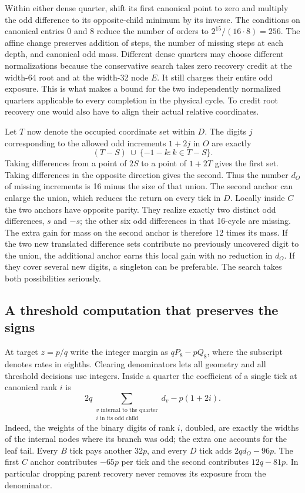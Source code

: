 \documentclass[12pt,letterpaper]{article}
\begin{document}
Within either dense quarter, shift its first canonical point to zero and multiply the odd difference to its opposite-child minimum by its inverse. The conditions on canonical entries 0 and 8 reduce the number of orders to \(2^{15}/(16\cdot8)=256\). The affine change preserves addition of steps, the number of missing steps at each depth, and canonical odd mass. Different dense quarters may choose different normalizations because the conservative search takes zero recovery credit at the width-64 root and at the width-32 node \(E\). It still charges their entire odd exposure. This is what makes a bound for the two independently normalized quarters applicable to every completion in the physical cycle. To credit root recovery one would also have to align their actual relative coordinates.

Let \(T\) now denote the occupied coordinate set within \(D\). The digits \(j\) corresponding to the allowed odd increments \(1+2j\) in \(O\) are exactly
\[
                   (T-S)\ \cup\ \{-1-k:k\in T-S\}.
\]
Taking differences from a point of \(2S\) to a point of \(1+2T\) gives the first set. Taking differences in the opposite direction gives the second. Thus the number \(d_O\) of missing increments is 16 minus the size of that union. The second anchor can enlarge the union, which reduces the return on every tick in \(D\). Locally inside \(C\) the two anchors have opposite parity. They realize exactly two distinct odd differences, \(s\) and \(-s\); the other six odd differences in that 16-cycle are missing. The extra gain for mass on the second anchor is therefore 12 times its mass. If the two new translated difference sets contribute no previously uncovered digit to the union, the additional anchor earns this local gain with no reduction in \(d_O\). If they cover several new digits, a singleton can be preferable. The search takes both possibilities seriously.

\subsection{A threshold computation that preserves the signs}

At target \(z=p/q\) write the integer margin as \(qP_8-pQ_8\), where the subscript denotes rates in eighths. Clearing denominators lets all geometry and all threshold decisions use integers. Inside a quarter the coefficient of a single tick at canonical rank \(i\) is
\[
 2q\!\sum_{\substack{v\text{ internal to the quarter}\\i\text{ in its odd child}}}\!d_v
                     -p(1+2i).
\]
Indeed, the weights of the binary digits of rank \(i\), doubled, are exactly the widths of the internal nodes where its branch was odd; the extra one accounts for the leaf tail. Every \(B\) tick pays another \(32p\), and every \(D\) tick adds \(2q d_O-96p\). The first \(C\) anchor contributes \(-65p\) per tick and the second contributes \(12q-81p\). In particular dropping parent recovery never removes its exposure from the denominator.
\end{document}
